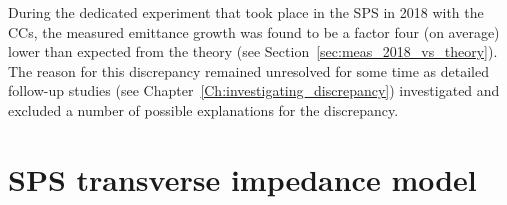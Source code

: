 
During the dedicated experiment that took place in the SPS
in 2018 with the CCs, the measured emittance
growth was found to be a factor four (on average) lower than
expected from the theory (see Section~\ref{sec:meas_2018_vs_theory}). The reason for this discrepancy remained unresolved for some time as detailed follow-up studies (see Chapter~\ref{Ch:investigating_discrepancy}) investigated and excluded a number of possible explanations for the discrepancy.










\section{SPS transverse impedance model}



